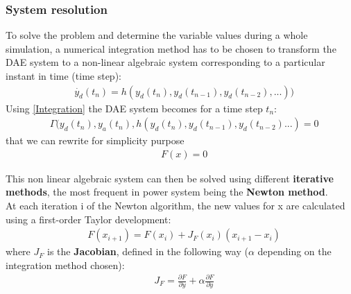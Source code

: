 \documentclass[a4paper, 12pt]{report}
\begin{document}
\subsubsection{System resolution}
\label{Dynawo_Solver_System_Resolution}

To solve the problem and determine the variable values during a whole simulation, a numerical integration method has to be chosen to transform the \ac{DAE} system to a non-linear algebraic system corresponding to a particular instant in time (time step):
\begin{equation}
\begin{aligned}
& \dot{y_d}(t_n) = h(y_d(t_n), y_d(t_{n-1}), y_d(t_{n-2}), ...))
\end{aligned}
\label{Integration}
\end{equation}
Using \eqref{Integration} the \ac{DAE} system becomes for a time step $t_n$:
\begin{equation}
\begin{aligned}
& \Gamma(y_d(t_n), y_a(t_n), h(y_d(t_n), y_d(t_{n-1}), y_d(t_{n-2}) ...) = 0
\end{aligned}
\end{equation}
that we can rewrite for simplicity purpose
\begin{equation}
\begin{aligned}
& F(x) = 0
\end{aligned}
\label{Correction}
\end{equation}

This non linear algebraic system can then be solved using different \textbf{iterative methods}, the most frequent in power system being the \textbf{Newton method}. \\

At each iteration i of the Newton algorithm, the new values for x are calculated using a first-order Taylor development:
\begin{equation}
\begin{aligned}
& F(x_{i+1}) = F(x_i) + J_F(x_i)(x_{i+1} - x_i)
\end{aligned}
\label{Newton}
\end{equation}
where $J_F$ is the \textbf{Jacobian}, defined in the following way ($\alpha$ depending on the integration method chosen):
\begin{equation}
\begin{aligned}
& J_F = \frac{\partial F}{\partial y} + \alpha \frac{\partial F}{\partial \dot{y}}
\end{aligned}
\end{equation}
\end{document}
